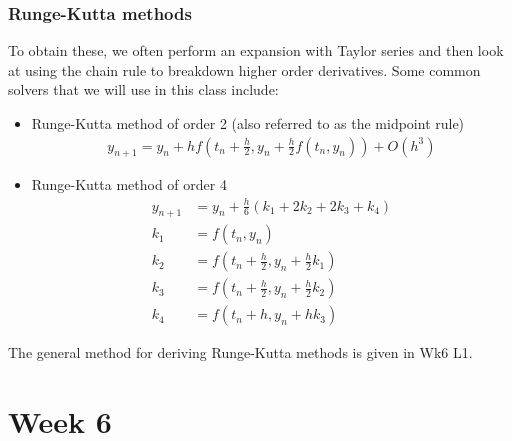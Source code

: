 \documentclass[11pt,a4paper]{report}
\begin{document}
	\subsubsection{Runge-Kutta methods}
	To obtain these, we often perform an expansion with Taylor series and then look at using the chain rule to breakdown higher order derivatives. Some common solvers that we will use in this class include:
	\begin{itemize}
		\item Runge-Kutta method of order 2 (also referred to as the midpoint rule)
		\begin{align}
		y_{n+1} = y_n + h f\left(t_n + \frac{h}{2}, y_n + \frac{h}{2} f(t_n,y_n)\right) + O(h^3)
		\end{align}
		\item Runge-Kutta method of order 4
		\begin{align}
		y_{n+1} &= y_n + \frac{h}{6} \left( k_1 + 2k_2 + 2k_3 + k_4 \right) \\
		k_1 &= f(t_n,y_n)\nonumber \\
		k_2 &= f\left(t_n + \frac{h}{2}, y_n + \frac{h}{2}k_1\right) \nonumber\\
		k_3 &= f\left(t_n + \frac{h}{2}, y_n + \frac{h}{2}k_2\right) \nonumber\\
		k_4 &= f\left(t_n + h, y_n + hk_3\right) \nonumber
		\end{align}
	\end{itemize}
	The general method for deriving Runge-Kutta methods is given in Wk6 L1.
	\newpage
	\section{Week 6}
\end{document}
